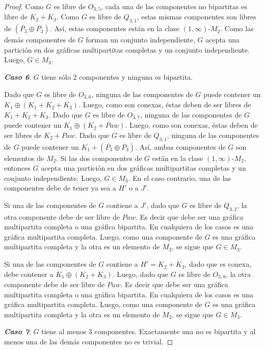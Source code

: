 \begin{proof}
Como $G$ es libre de $O_{3,5}$, cada una de las componentes no bipartitas es libre de $K_2+K_3$. Como $G$ es libre de $Q_{3,1}$, estas mismas componentes son libres de $(\overline{P_3}\oplus\overline{P_3})$. Así, estas componentes están en la clase $(1,\infty)$-$M_2$. Como las demás componentes de $G$ forman un conjunto independiente, $G$ acepta una partición en dos gráficas multipartitas completas y un conjunto independiente. Luego, $G\in M_3$.

\emph{\textbf{Caso 6}}: $G$ tiene sólo 2 componentes y ninguna es bipartita.

Dado que $G$ es libre de $O_{3,6}$, ninguna de las componentes de $G$ puede contener un $K_1\oplus (K_1+K_2+K_3)$. Luego, como son conexas, éstas deben de ser libres de $K_1+K_2+K_3$. Dado que $G$ es libre de $O_{3,7}$, ninguna de las componentes de $G$ puede contener un $K_1\oplus (K_2+Paw)$. Luego, como son conexas, éstas deben de ser libres de $K_2+Paw$. Dado que $G$ es libre de $Q_{3,1}$, ninguna de las componentes de $G$ puede contener un $K_1 + (\overline{P_3}\oplus\overline{P_3})$. Así, ambas componentes de $G$ son elementos de $M_2$. Si las dos componentes de $G$ están en la clase $(1,\infty)$-$M_2$, entonces $G$ acepta una partición en dos gráficas multipartitas completas y un conjunto independiente. Luego, $G\in M_3$. En el caso contrario, una de las componentes debe de tener ya sea a $H'$ o a $J'$.

Si una de las componentes de $G$ contiene a $J'$, dado que $G$ es libre de $Q_{3,2}$, la otra componente debe de ser libre de $Paw$. Es decir que debe ser una gráfica multipartita completa o una gráfica bipartita. En cualquiera de los casos es una gráfica multipartita completa. Luego, como una componente de $G$ es una gráfica multipartita completa y la otra es un elemento de $M_2$, se sigue que $G\in M_3$.

Si una de las componentes de $G$ contiene a $H'=K_2+K_3$, dado que es conexa, debe contener a $K_1\oplus(K_2+K_3)$. Luego, dado que $G$ es libre de $O_{3,8}$, la otra componente debe de ser libre de $Paw$. Es decir que debe ser una gráfica multipartita completa o una gráfica bipartita. En cualquiera de los casos es una gráfica multipartita completa. Luego, como una componente de $G$ es una gráfica multipartita completa y la otra es un elemento de $M_2$, se sigue que $G\in M_3$.

\emph{\textbf{Caso 7}}: $G$ tiene al menos 3 componentes. Exactamente una no es bipartita y al menos una de las demás componentes no es trivial.


\end{proof}
